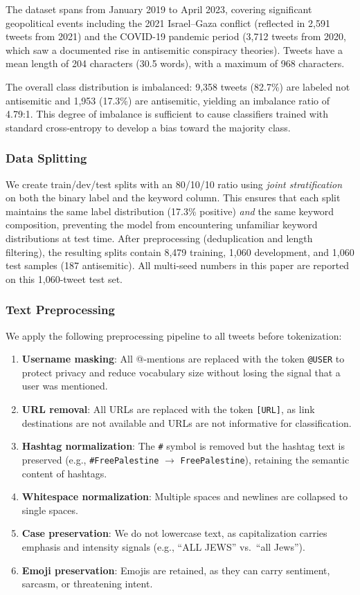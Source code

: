 The dataset spans from January 2019 to April 2023, covering significant geopolitical events including the 2021 Israel--Gaza conflict (reflected in 2,591 tweets from 2021) and the COVID-19 pandemic period (3,712 tweets from 2020, which saw a documented rise in antisemitic conspiracy theories). Tweets have a mean length of 204 characters (30.5 words), with a maximum of 968 characters.

The overall class distribution is imbalanced: 9,358 tweets (82.7\%) are labeled not antisemitic and 1,953 (17.3\%) are antisemitic, yielding an imbalance ratio of 4.79:1. This degree of imbalance is sufficient to cause classifiers trained with standard cross-entropy to develop a bias toward the majority class.

\subsubsection{Data Splitting}

We create train/dev/test splits with an 80/10/10 ratio using \emph{joint stratification} on both the binary label and the keyword column. This ensures that each split maintains the same label distribution (17.3\% positive) \emph{and} the same keyword composition, preventing the model from encountering unfamiliar keyword distributions at test time. After preprocessing (deduplication and length filtering), the resulting splits contain 8{,}479 training, 1{,}060 development, and 1{,}060 test samples (187 antisemitic). All multi-seed numbers in this paper are reported on this 1{,}060-tweet test set.

\subsubsection{Text Preprocessing}

We apply the following preprocessing pipeline to all tweets before tokenization:
\begin{enumerate}[leftmargin=*,itemsep=1pt]
    \item \textbf{Username masking}: All @-mentions are replaced with the token \texttt{@USER} to protect privacy and reduce vocabulary size without losing the signal that a user was mentioned.
    \item \textbf{URL removal}: All URLs are replaced with the token \texttt{[URL]}, as link destinations are not available and URLs are not informative for classification.
    \item \textbf{Hashtag normalization}: The \texttt{\#} symbol is removed but the hashtag text is preserved (e.g., \texttt{\#FreePalestine} $\rightarrow$ \texttt{FreePalestine}), retaining the semantic content of hashtags.
    \item \textbf{Whitespace normalization}: Multiple spaces and newlines are collapsed to single spaces.
    \item \textbf{Case preservation}: We do not lowercase text, as capitalization carries emphasis and intensity signals (e.g., ``ALL JEWS'' vs.\ ``all Jews'').
    \item \textbf{Emoji preservation}: Emojis are retained, as they can carry sentiment, sarcasm, or threatening intent.
\end{enumerate}

